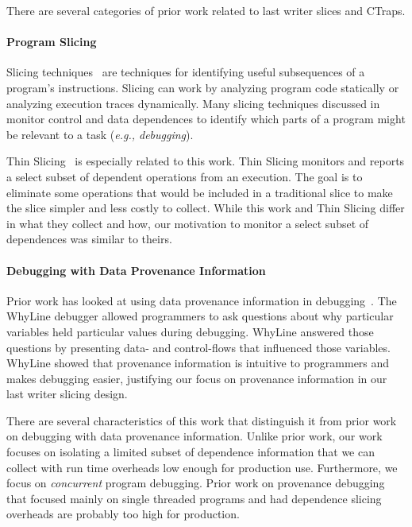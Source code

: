 \documentclass[preprint,9pt]{sigplanconf}
\newcommand{\ctraps}{CTraps\xspace}
\begin{document}
There are several categories of prior work related to last writer slices and
\ctraps.  

\paragraph{Program Slicing}
Slicing techniques~\cite{tipslicingsurvey} are techniques for identifying
useful subsequences of a program's instructions.   Slicing can work by
analyzing program code statically or analyzing execution traces dynamically.
Many slicing techniques discussed in ~\cite{tipslicingsurvey} monitor control
and data dependences to identify which parts of a program might be relevant to
a task ({\em e.g., debugging}).


Thin Slicing~\cite{thinslicing} is especially related to this work. Thin
Slicing monitors and reports a select subset of dependent operations from an
execution.  The goal is to eliminate some operations that would be included in
a traditional slice to make the slice simpler and less costly to collect.
While this work and Thin Slicing differ in what they collect and how, our
motivation to monitor a select subset of dependences was similar to theirs.  



\paragraph{Debugging with Data Provenance Information}

Prior work has looked at using data provenance information in
debugging~\cite{whylineicse, whylinechi}.  The WhyLine debugger allowed
programmers to ask questions about why particular variables held particular
values during debugging.  WhyLine answered those questions by presenting data-
and control-flows that influenced those variables.  WhyLine showed that
provenance information is intuitive to programmers and makes debugging easier,
justifying our focus on provenance information in our last writer slicing
design.

There are several characteristics of this work that distinguish it from prior
work on debugging with data provenance information.  Unlike prior work, our
work focuses on isolating a limited subset of dependence information that we
can collect with run time overheads low enough for production use.
Furthermore, we focus on {\em concurrent} program debugging.  Prior work on
provenance debugging that focused mainly on single threaded programs and had
dependence slicing overheads are probably too high for production.
\end{document}
